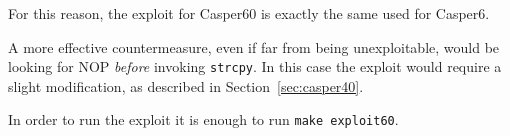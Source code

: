 For this reason, the exploit for Casper60 is exactly the same used for Casper6. 

A more effective countermeasure, even if far from being unexploitable, would be looking for NOP \textit{before} invoking \texttt{strcpy}. In this case the exploit would require a slight modification, as described in Section~\ref{sec:casper40}.

In order to run the exploit it is enough to run \texttt{make exploit60}.